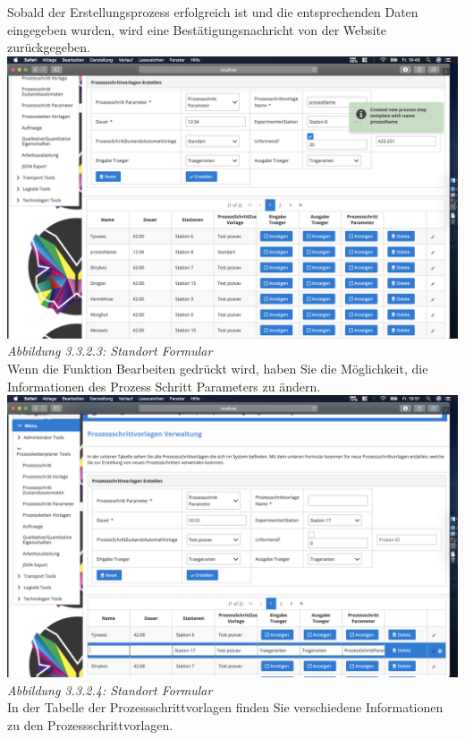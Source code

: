 \documentclass[enabledeprecatedfontcommands,fontsize=12pt,paper=a4,twoside]{scrartcl}
\begin{document}
Sobald der Erstellungsprozess erfolgreich ist und die entsprechenden Daten eingegeben wurden, wird eine Bestätigungsnachricht von der Website zurückgegeben.\\

\hypertarget{sc3.3.2.3}{
\includegraphics[width=1\textwidth]{Screenshots/332MeldungCreation.png}
\textit{Abbildung 3.3.2.3: Standort Formular}
} \\
Wenn die Funktion Bearbeiten gedrückt wird, haben Sie die Möglichkeit, die Informationen des Prozess Schritt Parameters zu ändern.\\

\hypertarget{sc3.3.2.4}{
\includegraphics[width=1\textwidth]{Screenshots/332EditViewPsv.png}
\textit{Abbildung 3.3.2.4: Standort Formular}
} \\

In der Tabelle der Prozessschrittvorlagen finden Sie verschiedene Informationen zu den Prozessschrittvorlagen.\\
\end{document}
